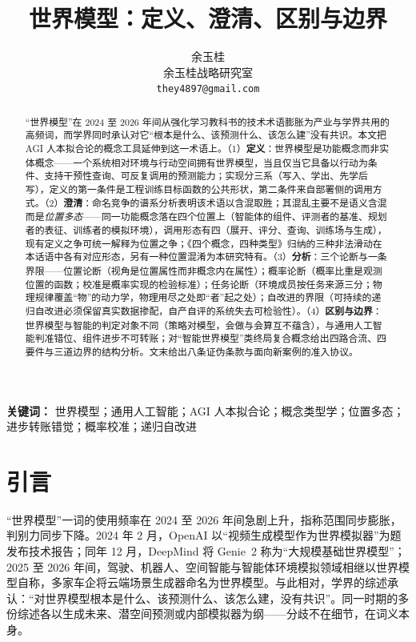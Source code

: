 \documentclass[10pt,fontset=fandol]{ctexart}
\title{世界模型：定义、澄清、区别与边界}
\author{余玉桂\\ 余玉桂战略研究室\\ \texttt{they4897@gmail.com}}
\date{}
\begin{document}
\maketitle

\begin{abstract}
\noindent“世界模型”在 2024 至 2026 年间从强化学习教科书的技术术语膨胀为产业与学界共用的高频词，而学界同时承认对它“根本是什么、该预测什么、该怎么建”没有共识。本文把 AGI 人本拟合论的概念工具延伸到这一术语上。（1）\textbf{定义}：世界模型是功能概念而非实体概念——一个系统相对环境与行动空间拥有世界模型，当且仅当它具备以行动为条件、支持干预性查询、可反复调用的预测能力；实现分三系（写入、学出、先学后写），定义的第一条件是工程训练目标函数的公共形状，第二条件来自部署侧的调用方式。（2）\textbf{澄清}：命名竞争的谱系分析表明该术语以含混取胜；其混乱主要不是语义含混而是\emph{位置多态}——同一功能概念落在四个位置上（智能体的组件、评测者的基准、规划者的表征、训练者的模拟环境），调用形态有四（展开、评分、查询、训练场与生成），现有定义之争可统一解释为位置之争；《四个概念，四种类型》归纳的三种非法滑动在本话语中各有对应形态，另有一种位置混淆为本研究特有。（3）\textbf{分析}：三个论断与一条界限——位置论断（视角是位置属性而非概念内在属性）；概率论断（概率比重是观测位置的函数；校准是概率实现的检验标准）；任务论断（环境成员按任务来源三分；物理规律覆盖“物”的动力学，物理用尽之处即“者”起之处）；自改进的界限（可持续的递归自改进必须保留真实数据掺配，自产自评的系统失去可检验性）。（4）\textbf{区别与边界}：世界模型与智能的判定对象不同（策略对模型，会做与会算互不蕴含），与通用人工智能判准错位、组件进步不可转账；对“智能世界模型”类终局复合概念给出四路合流、四要件与三道边界的结构分析。文末给出八条证伪条款与面向新案例的准入协议。
\end{abstract}

\medskip
\noindent\textbf{关键词：} 世界模型；通用人工智能；AGI 人本拟合论；概念类型学；位置多态；进步转账错觉；概率校准；递归自改进

\section{引言}\label{sec:intro}

“世界模型”一词的使用频率在 2024 至 2026 年间急剧上升，指称范围同步膨胀，判别力同步下降。2024 年 2 月，OpenAI 以“视频生成模型作为世界模拟器”为题发布技术报告\cite{openai2024sora}；同年 12 月，DeepMind 将 Genie~2 称为“大规模基础世界模型”\cite{deepmind2024genie2}；2025 至 2026 年间，驾驶、机器人、空间智能与智能体环境模拟领域相继以世界模型自称，多家车企将云端场景生成器命名为世界模型。与此相对，学界的综述承认：“对世界模型根本是什么、该预测什么、该怎么建，没有共识”\cite{chen2026definition}。同一时期的多份综述各以生成未来、潜空间预测或内部模拟器为纲\cite{ding2024understanding,li2025embodied}——分歧不在细节，在词义本身。
\end{document}
